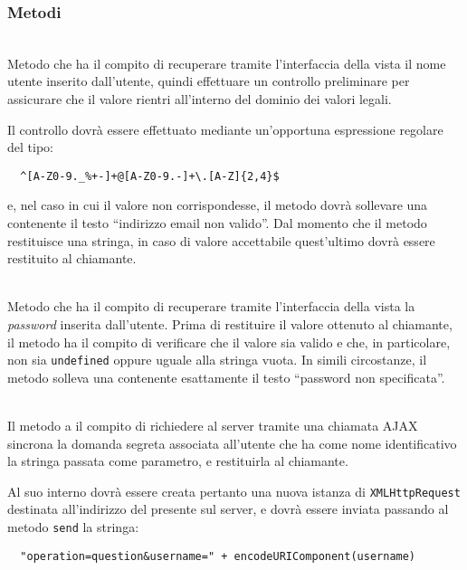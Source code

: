 \subsubsection*{Metodi}
\begin{description}

\item{}\\
Metodo che ha il compito di recuperare tramite l'interfaccia della vista il nome utente inserito dall'utente, quindi effettuare un controllo preliminare per assicurare che il valore rientri all'interno del dominio dei valori legali.

Il controllo dovrà essere effettuato mediante un'opportuna espressione regolare del tipo:
\begin{verbatim}
  ^[A-Z0-9._%+-]+@[A-Z0-9.-]+\.[A-Z]{2,4}$
\end{verbatim}
e, nel caso in cui il valore non corrispondesse, il metodo dovrà sollevare una  contenente il testo ``indirizzo email non valido''. Dal momento che il metodo restituisce una stringa, in caso di valore accettabile quest'ultimo dovrà essere restituito al chiamante.

\item{}\\
Metodo che ha il compito di recuperare tramite l'interfaccia della vista la \textit{password} inserita dall'utente. Prima di restituire il valore ottenuto al chiamante, il metodo ha il compito di verificare che il valore sia valido e che, in particolare, non sia \verb+undefined+ oppure uguale alla stringa vuota. In simili circostanze, il metodo solleva una  contenente esattamente il testo ``password non specificata''.

\item{}\\
Il metodo a il compito di richiedere al server tramite una chiamata AJAX sincrona la domanda segreta associata all'utente che ha come nome identificativo la stringa passata come parametro, e restituirla al chiamante.

Al suo interno dovrà essere creata pertanto una nuova istanza di \verb+XMLHttpRequest+ destinata all'indirizzo del  presente sul server, e dovrà essere inviata  passando al metodo \verb+send+ la stringa:
\begin{verbatim}
  "operation=question&username=" + encodeURIComponent(username)
\end{verbatim}


\end{description}
